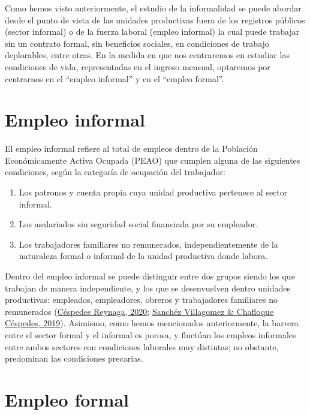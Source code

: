 \documentclass[
  letterpaper,
  12pt,
  oneside,
  spanish,
  doublespacing,
  headsepline,
  parskip]{MastersDoctoralThesis}
\providecommand{\tightlist}{%
  \setlength{\itemsep}{0pt}\setlength{\parskip}{0pt}}\usepackage{longtable,booktabs,array}
\begin{document}
Como hemos visto anteriormente, el estudio de la informalidad se puede
abordar desde el punto de vista de las unidades productivas fuera de los
registros públicos (sector informal) o de la fuerza laboral (empleo
informal) la cual puede trabajar sin un contrato formal, sin beneficios
sociales, en condiciones de trabajo deplorables, entre otras. En la
medida en que nos centraremos en estudiar las condiciones de vida,
representadas en el ingreso mensual, optaremos por centrarnos en el
``empleo informal'' y en el ``empleo formal''.

\hypertarget{empleo-informal}{%
\section{Empleo informal}\label{empleo-informal}}

El empleo informal refiere al total de empleos dentro de la Población
Económicamente Activa Ocupada (PEAO) que cumplen alguna de las
siguientes condiciones, según la categoría de ocupación del trabajador:

\begin{enumerate}
\def\labelenumi{\roman{enumi})}
\tightlist
\item
  Los patronos y cuenta propia cuya unidad productiva pertenece al
  sector informal.
\item
  Los asalariados sin seguridad social financiada por su empleador.
\item
  Los trabajadores familiares no remunerados, independientemente de la
  naturaleza formal o informal de la unidad productiva donde labora.
\end{enumerate}

Dentro del empleo informal se puede distinguir entre dos grupos siendo
los que trabajan de manera independiente, y los que se desenvuelven
dentro unidades productivas: empleados, empleadores, obreros y
trabajadores familiares no remunerados
(\protect\hyperlink{ref-cuxe9spedesreynaga2020}{Céspedes Reynaga, 2020};
\protect\hyperlink{ref-sanchuxe9zvillagomez2019}{Sanchéz Villagomez \&
Chafloque Céspedes, 2019}). Asimismo, como hemos mencionados
anteriormente, la barrera entre el sector formal y el informal es
porosa, y fluctúan los empleos informales entre ambos sectores con
condiciones laborales muy distintas; no obstante, predominan las
condiciones precarias.

\hypertarget{empleo-formal}{%
\section{Empleo formal}\label{empleo-formal}}
\end{document}
